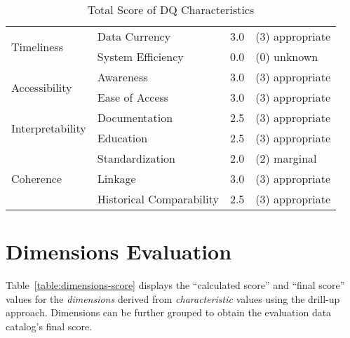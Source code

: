 \begin{table}[htbp]
\begin{tabular}{llll}
        \multirow{2}{*}{Timeliness}         & Data Currency                 & 3.0               & (3) appropriate       \\
                                            & System Efficiency             & 0.0               & (0) unknown           \\ \midrule
        \multirow{2}{*}{Accessibility}      & Awareness                     & 3.0               & (3) appropriate       \\
                                            & Ease of Access                & 3.0               & (3) appropriate       \\ \midrule
        \multirow{2}{*}{Interpretability}   & Documentation                 & 2.5               & (3) appropriate       \\
                                            & Education                     & 2.5               & (3) appropriate       \\ \midrule
        \multirow{3}{*}{Coherence}          & Standardization               & 2.0               & (2) marginal          \\
                                            & Linkage                       & 3.0               & (3) appropriate       \\
                                            & Historical Comparability      & 2.5               & (3) appropriate       \\

        \bottomrule
    \end{tabular}

    \caption{Total Score of DQ Characteristics}
    \label{table:characteristics-score}
\end{table}
\FloatBarrier

\newpage
\section{Dimensions Evaluation}

Table~\ref{table:dimensions-score} displays the \enquote{calculated score} and \enquote{final score} values for the \textit{dimensions} derived from \textit{characteristic} values using the drill-up approach.
Dimensions can be further grouped to obtain the evaluation data catalog's final score.

